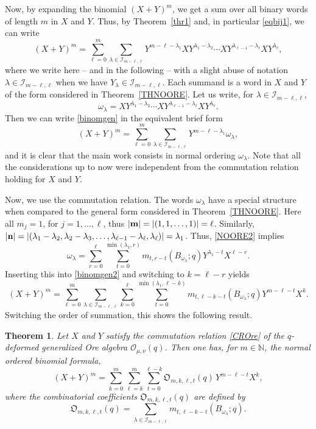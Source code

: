 \documentclass[10pt]{amsart}
\newtheorem{theorem}{Theorem}[section]%
\begin{document}
Now, by expanding the binomial $(X+Y)^m$, we get a sum over all binary words of length $m$ in $X$ and $Y$. Thus, by Theorem~\ref{thr1} and, in particular \eqref{eqbij1}, we can write
\begin{equation}\label{binomgen}
(X+Y)^m=\sum_{\ell=0}^m \sum_{\lambda \in \mathcal{I}_{m-\ell,\ell}}Y^{m-\ell-\lambda_1}XY^{\lambda_1-\lambda_2}\cdots XY^{\lambda_{\ell-1}-\lambda_\ell}XY^{\lambda_\ell},
\end{equation}
where we write here -- and in the following -- with a slight abuse of notation $\lambda \in \mathcal{I}_{m-\ell,\ell}$ when we have $Y_{\lambda} \in \mathcal{I}_{m-\ell,\ell}$. Each summand is a word in $X$ and $Y$ of the form considered in Theorem~\ref{THNOORE}. Let us write, for $\lambda \in \mathcal{I}_{m-\ell,\ell}$,
$$
\omega_{\lambda}=XY^{\lambda_1-\lambda_2}\cdots XY^{\lambda_{\ell-1}-\lambda_\ell}XY^{\lambda_\ell}.
$$
Then we can write \eqref{binomgen} in the equivalent brief form
\begin{equation}\label{binomgen2}
(X+Y)^m=\sum_{\ell=0}^m \sum_{\lambda \in \mathcal{I}_{m-\ell,\ell}}Y^{m-\ell-\lambda_1}\omega_{\lambda},
\end{equation}
and it is clear that the main work consists in normal ordering $\omega_{\lambda}$. Note that all the considerations up to now were independent from the commutation relation holding for $X$ and $Y$. 

Now, we use the commutation relation. The words $\omega_{\lambda}$ have a special structure when compared to the general form considered in Theorem~\ref{THNOORE}. Here all $m_j=1$, for $j=1,\ldots,\ell$, thus $|{\bf m}|=|(1,1,\ldots,1)|=\ell$. Similarly, $|{\bf n}|=|(\lambda_1-\lambda_2,\lambda_2-\lambda_3,\ldots,\lambda_{\ell-1}-\lambda_{\ell},\lambda_{\ell} )|=\lambda_1$. 
Thus, \eqref{NOORE2} implies 
$$
\omega_{\lambda} = \sum_{r=0}^{\ell }\sum_{t=0}^{\min(\lambda_1, r)} m_{t,r-t}(B_{\omega_{\lambda}};q) Y^{\lambda_1-t}X^{\ell-r}. 
$$
Inserting this into \eqref{binomgen2} and switching to $k=\ell - r$ yields
$$
(X+Y)^m=\sum_{\ell=0}^m \sum_{\lambda \in \mathcal{I}_{m-\ell,\ell}}\sum_{k=0}^{\ell }\sum_{t=0}^{\min(\lambda_1, \ell - k)} m_{t,\ell -k-t}(B_{\omega_{\lambda}};q) Y^{m-\ell-t}X^{k}.
$$
Switching the order of summation, this shows the following result.
\begin{theorem}\label{THOREBINOM} Let $X$ and $Y$ satisfy the commutation relation \eqref{CROre} of the $q$-deformed generalized Ore algebra ${\mathcal O}_{\mu,\nu}(q)$. Then one has, for $m\in \mathbb{N}$, the normal ordered binomial formula,
\begin{equation}\label{OREBINOM}
 (X+Y)^m=\sum_{k=0}^{m}\sum_{\ell=k}^m \sum_{t=0}^{\ell - k} {\mathfrak O}_{m,k,\ell,t}(q) \, Y^{m-\ell-t}X^{k},
\end{equation}
where the combinatorial coefficients ${\mathfrak O}_{m,k,\ell,t}(q)$ are defined by
$$
{\mathfrak O}_{m,k,\ell,t}(q)=\sum_{\lambda \in \mathcal{I}_{m-\ell,\ell}} m_{t,\ell -k-t}(B_{\omega_{\lambda}};q).
$$
\end{theorem}
\end{document}
